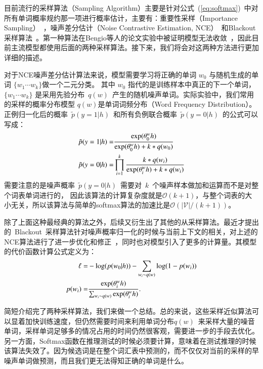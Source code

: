 目前流行的采样算法（Sampling Algorithm）主要是针对公式~(\ref{eq:softmax})~中对所有单词概率规约那一项进行概率估计，主要有：重要性采样（Importance Sampling）~，噪声差分估计（Noise Contrastive Estimation, NCE）~和Blackout 采样算法~。第一种算法在Bengio等人的论文实验中被证明模型无法收敛~，因此目前主流模型都使用后面的两种采样算法。接下来，我们将会对这两种方法进行更加详细的描述。

对于NCE噪声差分估计算法来说，模型需要学习将正确的单词 $w_0$ 与随机生成的单词 $\{w_1\cdots w_k\}$做一个二元分类。 其中 $w_0$ 指代的是训练样本中真正的下一个单词， $\{w_1\cdots w_k\}$ 是采用先验分布~$q(w)$~产生的随机噪声单词。实际实验中，我们常用的采样的概率分布模型 $q(w)$是单词词频分布（Word Frequency Distribution）。 正例归一化后的概率~$\tilde{p}(y=1|h)$~和所有负例联合概率~$\tilde{p}(y=0|h)$~的公式可以写成：
\begin{equation}\label{equ:nce}
\setlength{\abovedisplayskip}{8pt}
\setlength{\belowdisplayskip}{8pt}
\begin{split}
  \tilde{p}(y=1|h)=&\frac{\exp( \theta^w_0 h)}{ \exp( \theta^w_0 h)+k *q(w_0)}\\
  \tilde{p}(y=0|h)=&\prod_{i=1}^{k}\frac{k *q(w_i)}{\exp( \theta^w_i h)+k *q(w_i)}\\
\end{split}
\end{equation}
需要注意的是噪声概率~$\tilde{p}(y=0|h)$~需要对~$k$~个噪声样本做加和运算而不是对整个词表单词进行的， 因此该算法的计算复杂度就是$\mathcal{O}(k+1)$，与整个词表的大小无关，所以该算法与简单的softmax算法的加速比是$\mathcal{O}(\mathcal{|V|}/(k+1))$。

除了上面这种最经典的算法之外，后续又衍生出了其他的从采样算法。最近才提出的~Blackout~采样算法针对噪声概率归一化的时候与当前上下文的相关，对上述的NCE算法进行了进一步优化和修正~，同时也对模型引入了更多的计算量。其模型的代价函数计算公式定义为：
\begin{equation}
\setlength{\abovedisplayskip}{6pt}
\setlength{\belowdisplayskip}{6pt}
\begin{split}
  \ell=&-\log(p(w_0|h)) - \sum_{w_i \sim q(w)} \log(1 - p(w_i))\\
p(w_i) =& \frac{\exp(\theta^w_i h)}{\sum_{w_i \sim q(w)} \exp(\theta^w_i h)}.
\end{split}
\end{equation}

简短介绍完了两种采样算法，我们来做一个总结。总的来说，这些采样近似算法可以显着加快训练速度，但仍然需要时间来利用单词分布$q(w)$~来采样大量的噪音单词，采样单词足够多的情况占用的时间仍然很客观，需要进一步的手段去优化。 另一方面，Softmax函数在推理测试的时候必须要计算，意味着在测试推理的时候该算法失效了。因为候选词是在整个词汇表中预测的，而不仅仅对当前的采样的早噪声单词做预测，而且我们更无法得知正确的单词是什么。

